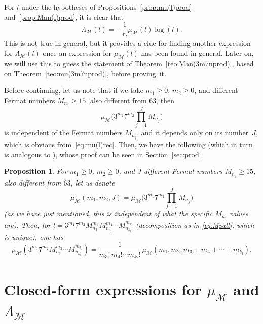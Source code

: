 \documentclass[11pt, a4paper]{article}
\newcommand{\calM}{\mathcal{M}}
\newcommand{\manM}{\Lambda_{\calM}}
\newcommand{\muM}{\mu_\calM}
\theoremstyle{plain}
\newtheorem{proposition}[theorem]{Proposition}
\theoremstyle{definition}
\begin{document}
For $l$ under the hypotheses of Propositions~\ref{prop:mu(l)prod} and~\ref{prop:Man(l)prod}, it is clear that
\begin{equation}
\label{eq:relmanmu}
  \manM(l) = -\frac{1}{r_l} \muM(l) \log(l).
\end{equation}
This is not true in general, but it provides a clue for finding another expression for $\manM(l)$ once an expression for $\muM(l)$ has been found in general. Later on, we will use this to guess the statement of Theorem~\ref{teo:Man(3m7nprod)}, based on Theorem~\ref{teo:mu(3m7nprod)}, before proving~it.

Before continuing, let us note that if we take $m_1 \ge 0$, $m_2 \ge 0$, and different Fermat numbers $M_{n_j}\ge 15$, also different from $63$,
then 
\[
  \muM\Big(3^{m_1} 7^{m_2} \prod_{j=1}^{J} M_{n_j}\Big)
\]
is independent of the Fermat numbers $M_{n_j}$, and it depends only on its number~$J$, which is obvious from~\eqref{eq:mu(l)rec}.
Then, we have the following (which in turn is analogous to \cite[Section 2.6]{MoNaVa}), whose proof can be seen in Section~\ref{sec:prod}.

\begin{proposition}
\label{prop:mu(3m7nprods)}
For $m_1 \ge 0$, $m_2 \ge 0$, and $J$ different Fermat numbers $M_{n_j}\ge 15$, also different from $63$, let us denote
\[
  \widetilde{\muM}(m_1,m_2,J) = \muM\Big(3^{m_1} 7^{m_2} \prod_{j=1}^{J} M_{n_j}\Big)
\]
(as we have just mentioned, this is independent of what the specific $M_{n_j}$ values are).
Then, for $l = 3^{m_1} 7^{m_2} M_{n_3}^{m_3} M_{n_4}^{m_4} \cdots M_{n_{k_l}}^{m_{k_l}}$ (decomposition as in \eqref{eq:Mpalt}, which is unique), one has
\[
  \muM(3^{m_1} 7^{m_2} M_{n_3}^{m_3} \cdots M_{n_{k_l}}^{m_{k_l}}) 
  = \frac{1}{m_3!\,m_4!\cdots m_{k_l}!} 
  \, \widetilde{\muM}(m_1,m_2,m_3+m_4+\cdots+m_{k_l}).
\]
\end{proposition}

\section{Closed-form expressions for $\muM$ and $\manM$}
\label{sec:valores}
\end{document}
